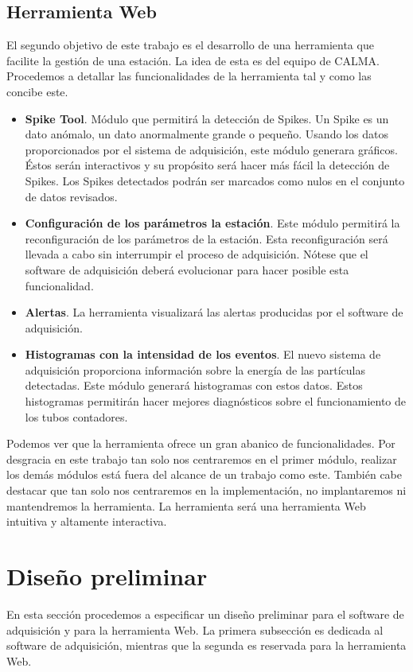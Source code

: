 	\subsection{Herramienta Web}
		El segundo objetivo de este trabajo es el desarrollo de una herramienta que facilite la gestión de una estación. La idea de esta
		es del equipo de CALMA. Procedemos a detallar las funcionalidades de la herramienta tal y como las concibe este.
		\begin{itemize}
			\item	\textbf{Spike Tool}. Módulo que permitirá la detección de Spikes. Un Spike es un dato anómalo, un dato
				anormalmente grande o pequeño. Usando los datos proporcionados por el sistema de adquisición, este módulo generara
				gráficos. Éstos serán interactivos y su propósito será hacer más fácil la detección de Spikes. Los Spikes detectados
				podrán ser marcados como nulos en el conjunto de datos revisados. 
			\item 	\textbf{Configuración de los parámetros la estación}. Este módulo permitirá la reconfiguración de los parámetros de la
				estación. Esta reconfiguración será llevada a cabo sin interrumpir el proceso de adquisición. Nótese que el software
				de adquisición deberá evolucionar para hacer posible esta funcionalidad.
			\item	\textbf{Alertas}. La herramienta visualizará las alertas producidas por el software de adquisición.
			\item 	\textbf{Histogramas con la intensidad de los eventos}. El nuevo sistema de adquisición proporciona información sobre
				la energía de las partículas detectadas. Este módulo generará histogramas con estos datos. Estos histogramas
				permitirán hacer mejores diagnósticos sobre el funcionamiento de los tubos contadores. 
		\end{itemize}
		Podemos ver que la herramienta ofrece un gran abanico de funcionalidades. Por desgracia en este trabajo tan solo nos centraremos en el
		primer módulo, realizar los demás módulos está fuera del alcance de un trabajo como este. También cabe destacar que tan solo nos
		centraremos en la implementación, no implantaremos ni mantendremos la herramienta. La herramienta será una herramienta Web intuitiva y
		altamente interactiva.

\section{Diseño preliminar}
	En esta sección procedemos a especificar un diseño preliminar para el software de adquisición y para la herramienta Web. La primera subsección
	es dedicada al software de adquisición, mientras que la segunda es reservada para la herramienta Web.
